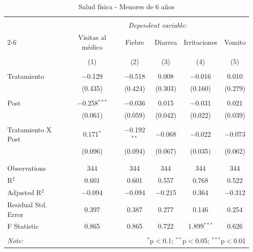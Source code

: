 
\begin{table}[H] \centering 
  \caption{Salud física - Menores de 6 años} 
  \label{reg_fisico_0_a_6} 
\tiny 
\begin{tabular}{@{\extracolsep{-7pt}}lccccc} 
\\[-1.8ex]\hline 
\hline \\[-1.8ex] 
 & \multicolumn{5}{c}{\textit{Dependent variable:}} \\ 
\cline{2-6} 
 & Visitas al médico & Fiebre & Diarrea & Irritaciones & Vomito \\ 
\\[-1.8ex] & (1) & (2) & (3) & (4) & (5)\\ 
\hline \\[-1.8ex] 
 Tratamiento & $-$0.129 & $-$0.518 & 0.008 & $-$0.016 & 0.010 \\ 
  & (0.435) & (0.424) & (0.303) & (0.160) & (0.279) \\ 
  & & & & & \\ 
 Post & $-$0.258$^{***}$ & $-$0.036 & 0.015 & $-$0.031 & 0.021 \\ 
  & (0.061) & (0.059) & (0.042) & (0.022) & (0.039) \\ 
  & & & & & \\ 
 Tratamiento X Post & 0.171$^{*}$ & $-$0.192$^{**}$ & $-$0.068 & $-$0.022 & $-$0.073 \\ 
  & (0.096) & (0.094) & (0.067) & (0.035) & (0.062) \\ 
  & & & & & \\ 
\hline \\[-1.8ex] 
Observations & 344 & 344 & 344 & 344 & 344 \\ 
R$^{2}$ & 0.601 & 0.601 & 0.557 & 0.768 & 0.522 \\ 
Adjusted R$^{2}$ & $-$0.094 & $-$0.094 & $-$0.215 & 0.364 & $-$0.312 \\ 
Residual Std. Error & 0.397 & 0.387 & 0.277 & 0.146 & 0.254 \\ 
F Statistic & 0.865 & 0.865 & 0.722 & 1.899$^{***}$ & 0.626 \\ 
\hline 
\hline \\[-1.8ex] 
\textit{Note:}  & \multicolumn{5}{r}{$^{*}$p$<$0.1; $^{**}$p$<$0.05; $^{***}$p$<$0.01} \\ 
\end{tabular} 
\end{table} 
